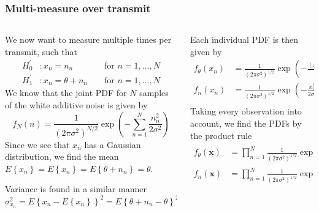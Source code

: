 \documentclass[compress,aspectratio=169]{beamer}
\newcommand{\E}[1]{\ensuremath{E\left\{#1\right\}}}
\begin{document}
\begin{frame} %
    \frametitle{Multi-measure over transmit}
    \begin{columns}
        \begin{column}{0.6\textwidth}
            We now want to measure multiple times per transmit, such that 
            \begin{alignat*}{2}
                H_{0}^{'} &: x_n = n_n &&\text{ for } n=1,\dots,N \\
                H_{1}^{'} &: x_n = \theta + n_n &&\text{ for } n=1,\dots,N
            \end{alignat*}
            We know that the joint PDF for $N$ samples of the white additive noise is
            given by 
            \begin{equation*}
                f_N\left(n\right) = \frac{1}{\left(2\pi\sigma^2\right)^{N/2}}\exp{\left(
                        -\sum^{N}_{n=1}{\frac{n_n^2}{2\sigma^2}}
                \right) }
            \end{equation*}
            Since we see that $x_n$ has a Gaussian distribution, we find the mean
            $\E{x_n} = \E{x_n} = \E{\theta+n_n}=\theta$.

            Variance is found in a similar manner
            $\sigma_{x_n}^2=\E{x_n - \E{x_n}}^2 = \E{\theta + n_n - \theta}^2 =
            \E{n_n}^2=\sigma^2$
        \end{column}
        \begin{column}{0.4\textwidth}
            Each individual PDF is then given by
            \begin{align*}
                f_\theta(x_n) &= \frac{1}{\left(2\pi\sigma^2\right)^{1/2}}\exp\left(-\frac{\left(x_n - \theta\right)^2 }{2\sigma^2}\right) \\
                f_n(x_n) &= \frac{1}{\left(2\pi\sigma^2\right)^{1/2}}\exp\left(-\frac{x_n^2 }{2\sigma^2}\right) \\
            \end{align*}
            Taking every observation into account, we find the PDFs by the product rule
            \begin{align*}
                f_\theta(\pmb{x}) &= \prod^{N}_{n=1} \frac{1}{\left(2\pi\sigma^2\right)^{1/2}}\exp\left(-\frac{\left(x_n - \theta\right)^2 }{2\sigma^2}\right) \\
                f_n(\pmb{x}) &= \prod^{N}_{n=1} \frac{1}{\left(2\pi\sigma^2\right)^{1/2}}\exp\left(-\frac{x_n^2 }{2\sigma^2}\right) \\
            \end{align*}
        \end{column}
    \end{columns}
\end{frame} %
\end{document}
